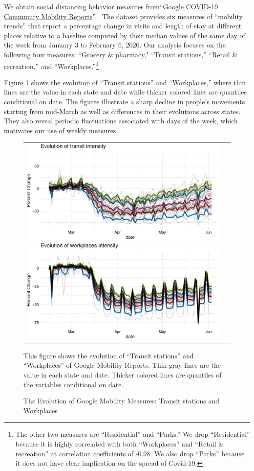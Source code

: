 \documentclass[11pt,reqno,letter]{amsart}
\theoremstyle{definition}
\begin{document}
We obtain social distancing behavior measures from``\href{https://www.google.com/covid19/mobility/}{Google COVID-19 Community Mobility Reports}''
\citep{google2020}.  The dataset provides six measures of ``mobility trends''  that report a percentage change in visits and length of stay at different places relative to a baseline computed by their median values of the same day of the week from January 3 to February 6, 2020.  Our analysis focuses on the following four measures: ``Grocery \& pharmacy," ``Transit stations,'' ``Retail \& recreation,'' and ``Workplaces.''\footnote{The other two measures are ``Residential'' and  ``Parks.''  We drop ``Residential'' because it is highly correlated with both ``Workplaces'' and  ``Retail \& recreation''  at correlation coefficients of -0.98. We also drop ``Parks'' because it does not have clear implication on the spread of Covid-19.}

Figure \ref{fig:transit-workplaces} shows the evolution of  ``Transit stations'' and ``Workplaces,'' where thin lines are the value in each state and date while thicker colored lines are quantiles  conditional on date. The figures illustrate a sharp decline in people's movements starting from mid-March as well as differences in their evolutions across states. They also reveal periodic fluctuations associated with days of the week, which motivates our use of weekly measures.

\begin{figure}\caption{The Evolution of Google Mobility Measures: Transit stations and Workplaces\label{fig:transit-workplaces}}\vspace{0.1cm}
    \begin{tabular}{cc}
      \includegraphics[width=0.5\linewidth]{tables_and_figures/transit}
      \includegraphics[width=0.5\linewidth]{tables_and_figures/workplaces}
       \end{tabular}
        \begin{flushleft}
        \scriptsize{This figure shows the evolution of ``Transit stations'' and  ``Workplaces'' of Google Mobility
      Reports. Thin gray lines are the value in each state and date. Thicker colored lines are
      quantiles of the variables conditional on date.}
      \end{flushleft}
\end{figure}
\end{document}

